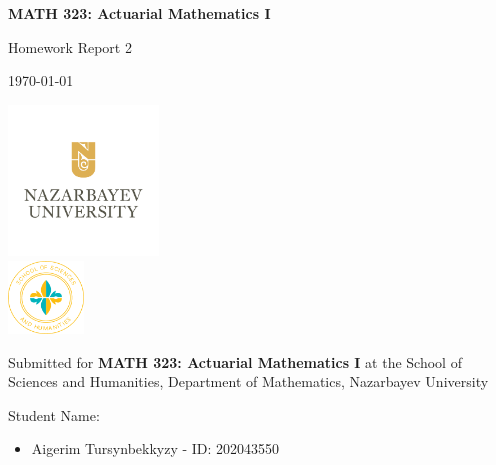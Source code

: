 \documentclass[12pt, a4paper]{article}
\begin{document}
\begin{titlepage}
    \centering
    
    \vspace*{0.5cm}
    
    {\Large\bfseries MATH 323: Actuarial Mathematics I\par}
    
    \vspace{1cm}
    
    {\large Homework Report 2\par}
    
    \vspace{0.5cm}
    
    {\today\par}
    
    \vspace{1pt}
    
    \includegraphics[width=0.3\textwidth]{NU-logo.png}\\
    \includegraphics[width=0.15\textwidth]{sosah-logo.png}

    \vspace{0.5cm}
    
    Submitted for {\bf MATH 323: Actuarial Mathematics I} at the School of Sciences and Humanities, Department of Mathematics, Nazarbayev University
    
    \vspace{0.5cm}
    
    {\large Student Name:\par}
    \begin{itemize}[leftmargin=5cm,rightmargin=4cm]
        \item  Aigerim Tursynbekkyzy - ID: 202043550
    \end{itemize}

    \vspace{0.5cm}
    

\end{titlepage}
\end{document}
